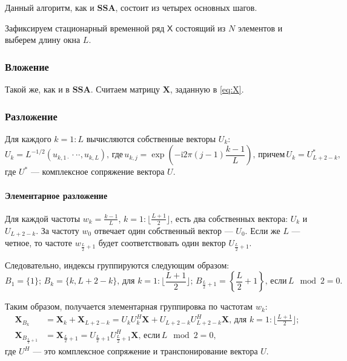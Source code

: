 \documentclass[a4paper, 11pt]{article}
\newcommand{\SSA}{\textbf{SSA}}
\newcommand{\TS}{\mathsf{X}}
\begin{document}
Данный алгоритм, как и $\SSA$, состоит из четырех основных шагов.

Зафиксируем стационарный временной ряд $\TS$ состоящий из $N$ элементов и выберем длину окна $L$.
\subsubsection{Вложение}
Такой же, как и в $\SSA$. Считаем матрицу $\mathbf{X}$, заданную в \eqref{eq:X}.

\subsubsection{Разложение}

Для каждого $k = 1:L$ вычисляются собственные векторы ${U}_{k}$:
\begin{equation*}
	{U}_{k}=L^{-1/2}(u_{k,1\cdot}\cdot\cdot\cdot,u_{k,L}), \, \text{где} \,
	u_{k,j}=\exp\left(-\mathrm{i}2\pi(j-1)\frac{k-1}{L}\right), \,
	\text{причем} \, U_{k} = U_{L+2-k}^*,
\end{equation*}
где $U^*$ --- комплексное сопряжение вектора $U$.


\paragraph{Элементарное разложение \newline}

Для каждой частоты $w_k = \frac{k-1}{L}$, $k = 1:\lfloor \frac{L+1}{2} \rfloor$, есть два собственных вектора: $U_k$ и $U_{L+2-k}$. За частоту $w_0$ отвечает один собственный вектор --- $U_0$. Если же $L$ --- четное, то частоте $w_{\frac{L}{2} + 1}$ будет соответствовать один вектор $U_{\frac{L}{2}+1}$.

Следовательно, индексы группируются следующим образом:
\begin{equation*}
	B_1 = \{1\}; \, B_k = \{k, L+2-k\}, \,  \text{для } k = 1:\lfloor \frac{L+1}{2}\rfloor; \,
	B_{\frac{L}{2} + 1} = \left\{ \frac{L}{2} + 1 \right\}, \, \text{если} \, L\mod 2 = 0.
\end{equation*}

Таким образом, получается элементарная группировка по частотам $w_k$:
\begin{align*}
	\mathbf X_{B_k}                 & = \mathbf X_k + \mathbf X_{L+2-k} = U_k U_k^H \mathbf X + U_{L+2-k} U_{L+2-k}^H \mathbf X, \,  \text{для } k = 1:\lfloor \frac{L+1}{2}\rfloor; \\
	\mathbf X_{B_{\frac{L}{2} + 1}} & = \mathbf X_{{\frac{L}{2} + 1}} =
	U_{\frac{L}{2} + 1} U_{\frac{L}{2} + 1}^H \mathbf X, \, \text{если} \, L \mod 2 = 0,
\end{align*}
где $U^H$ --- это комплексное сопряжение и транспонирование вектора $U$.
\end{document}
